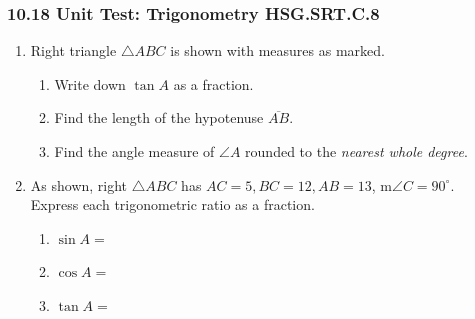 \documentclass[12pt, twoside]{article}
\begin{document}
\subsubsection*{10.18 Unit Test: Trigonometry \hfill HSG.SRT.C.8}
\begin{enumerate}
  \item Right triangle $\triangle ABC$ is shown with measures as marked.
  \begin{multicols}{2}
    \begin{enumerate}[itemsep=0.5cm]
      \item Write down $\tan A$ as a fraction.
      \item Find the length of the hypotenuse $\overline{AB}$.\vspace{1.5cm}
      \item Find the angle measure of $\angle A$ rounded to the \emph{nearest whole degree}.
      \vspace{1cm}
    \end{enumerate}
  \begin{flushright}
  \end{flushright}
  \end{multicols} \vspace{1cm}
  
\item As shown, right $\triangle ABC$ has $AC=5, BC=12, AB=13$, m$\angle C=90^\circ$. \\[0.25cm] 
Express each trigonometric ratio as a fraction.
  \begin{multicols}{2}
    \begin{enumerate}
      \item $\sin A =$
      \item $\cos A =$
      \item $\tan A =$ \vspace{1cm}
    \end{enumerate}
    \begin{center}
    \end{center}
  \end{multicols} \vspace{0.25cm}


\end{enumerate}
\end{document}
